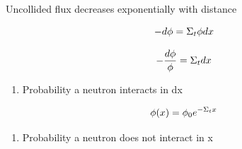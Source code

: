 \documentclass[aspectratio=1610,pdftex,dvipsnames,compress,xcolor={dvipsnames}]{beamer}
\begin{document}
\begin{frame}{Uncollided flux decreases exponentially with distance}

    \begin{equation}
        \LARGE
        -d\phi = \Sigma_t \phi dx
    \end{equation}

    \vspace*{\fill}

    \begin{equation}
        \LARGE
        -\frac{d\phi}{\phi} = \Sigma_t dx
    \end{equation}

    \vspace*{\fill}

    \begin{enumerate}[series=outerlist,topsep=0pt,itemsep=11pt,leftmargin=*,label=(\arabic*)]
        \item[]Probability a neutron interacts in dx
    \end{enumerate}

    \vspace*{\fill}

    \begin{equation}
        \LARGE
        \phi(x) = \phi_0 e^{-\Sigma_t x}
    \end{equation}

    \vspace*{\fill}

    \begin{enumerate}[series=outerlist,topsep=0pt,itemsep=11pt,leftmargin=*,label=(\arabic*)]
        \item[]Probability a neutron does not interact in x
    \end{enumerate}
\end{frame}
\end{document}
